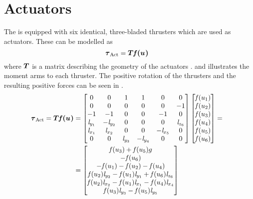 \section{Actuators}
The \abbrROV is equipped with six identical, three-bladed thrusters which are used as actuators. These can be modelled as
\begin{equation}\label{eq:act}
    \boldsymbol{\tau}_{\text{Act}} = \boldsymbol{T} \boldsymbol{\mathit{f}(u_{})} 
\end{equation}
where $\boldsymbol{T}$ is a matrix describing the geometry of the actuators \citep[p. 401]{fossen2011}.  and  illustrates the moment arms to each thruster. The positive rotation of the thrusters and the resulting positive forces can be seen in .
\begin{equation}
\begin{split}
    \boldsymbol{\tau}_{\text{Act}} = \boldsymbol{T} \boldsymbol{\mathit{f}(u_{})} 
    &=
    \begin{bmatrix}
    0& 0& 1& 1& 0& 0\\
    0& 0& 0&  0& 0& -1\\
    -1& -1& 0& 0& -1& 0\\
    \mathit{l}_{y_{1}} & -\mathit{l}_{y_{2}} & 0 &  0 &  0 & \mathit{l}_{z_{6}} \\
    \mathit{l}_{x_{1}} & \mathit{l}_{x_{2}} & 0 & 0 & -\mathit{l}_{x_{5}} & 0 \\
    0 & 0 & \mathit{l}_{y_{3}} & -\mathit{l}_{y_{4}} & 0 & 0 \\
    \end{bmatrix}
    \begin{bmatrix}
    \mathit{f}(u_{1}) \\
    \mathit{f}(u_{2}) \\
    \mathit{f}(u_{3}) \\
    \mathit{f}(u_{4}) \\
    \mathit{f}(u_{5}) \\
    \mathit{f}(u_{6}) \\
    \end{bmatrix}
    = \\
    &=\begin{bmatrix}
     \mathit{f}(u_{3}) + \mathit{f}(u_{5}) g \\
     -\mathit{f}(u_{6}) \\
     -\mathit{f}(u_{1}) - \mathit{f}(u_{2}) - \mathit{f}(u_{4}) \\
    \mathit{f}(u_{2}) \mathit{l}_{y_{2}} - \mathit{f}(u_{1}) \mathit{l}_{y_{1}} + \mathit{f}(u_{6}) \mathit{l}_{z_{6}} \\
    \mathit{f}(u_{2}) \mathit{l}_{x_{2}} - \mathit{f}(u_{1}) \mathit{l}_{x_{1}} - \mathit{f}(u_{4}) \mathit{l}_{x_{4}} \\
    \mathit{f}(u_{3}) \mathit{l}_{y_{3}} - \mathit{f}(u_{5}) \mathit{l}_{y_{5}} \\
    \end{bmatrix}
\end{split}
\end{equation}
